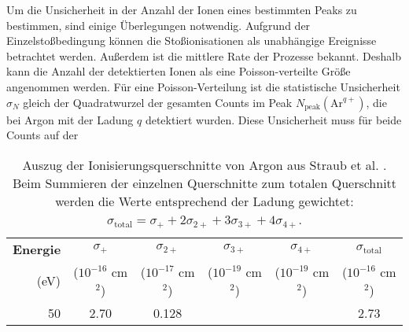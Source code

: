 Um die Unsicherheit in der Anzahl der Ionen eines bestimmten Peaks zu bestimmen, sind einige Überlegungen notwendig. Aufgrund der Einzelstoßbedingung können die Stoßionisationen als unabhängige Ereignisse betrachtet werden. Außerdem ist die mittlere Rate der Prozesse bekannt. Deshalb kann die Anzahl der detektierten Ionen als eine Poisson-verteilte Größe angenommen werden. Für eine Poisson-Verteilung ist die statistische Unsicherheit $\sigma_N$ gleich der Quadratwurzel der gesamten Counts im Peak $N_{\text{peak}}(\text{Ar}^{q+})$, die bei Argon mit der Ladung $q$ detektiert wurden. Diese Unsicherheit muss für beide Counts auf der
 
\begin{samepage}
    \begin{table}
        \centering
        \caption[Auszug der Ionisierungsquerschnitte von Argon aus Straub et al.]{Auszug der Ionisierungsquerschnitte von Argon aus Straub et al. \cite{Straub}. Beim Summieren der einzelnen Querschnitte zum totalen Querschnitt werden die Werte entsprechend der Ladung gewichtet:
        $\sigma_{\text{total}} = \sigma_+ + 2\sigma_{2+} + 3\sigma_{3+} + 4\sigma_{4+}$.}
        \label{tab:argon}
        \small
        \begin{tabular}{r c c c c c}
            \toprule
            \textbf{Energie} & $\sigma_+$ & $\sigma_{2+}$ & $\sigma_{3+}$ & $\sigma_{4+}$ & $\sigma_{\text{total}}$ \\
            (eV) & ($10^{-16}$ cm$^2$) & ($10^{-17}$ cm$^2$) & ($10^{-19}$ cm$^2$) & ($10^{-19}$ cm$^2$) & ($10^{-16}$ cm$^2$) \\
            \midrule
            50  & 2.70   & 0.128  &        &        & 2.73   \\

\end{tabular}
\end{table}
\end{samepage}
